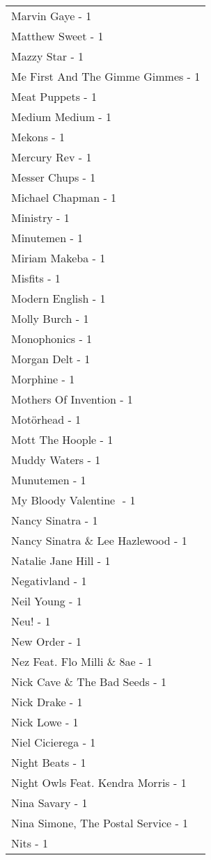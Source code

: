 \documentclass[
]{article}
\begin{document}
\begin{longtable}{l}
Marvin Gaye - 1 \\ 
Matthew Sweet - 1 \\ 
Mazzy Star - 1 \\ 
Me First And The Gimme Gimmes - 1 \\ 
Meat Puppets - 1 \\ 
Medium Medium - 1 \\ 
Mekons - 1 \\ 
Mercury Rev - 1 \\ 
Messer Chups - 1 \\ 
Michael Chapman - 1 \\ 
Ministry - 1 \\ 
Minutemen - 1 \\ 
Miriam Makeba - 1 \\ 
Misfits - 1 \\ 
Modern English - 1 \\ 
Molly Burch - 1 \\ 
Monophonics - 1 \\ 
Morgan Delt - 1 \\ 
Morphine - 1 \\ 
Mothers Of Invention - 1 \\ 
Motörhead - 1 \\ 
Mott The Hoople - 1 \\ 
Muddy Waters - 1 \\ 
Munutemen - 1 \\ 
My Bloody Valentine ‎ - 1 \\ 
Nancy Sinatra - 1 \\ 
Nancy Sinatra \& Lee Hazlewood - 1 \\ 
Natalie Jane Hill - 1 \\ 
Negativland - 1 \\ 
Neil Young - 1 \\ 
Neu! - 1 \\ 
New Order - 1 \\ 
Nez Feat. Flo Milli \& 8ae - 1 \\ 
Nick Cave \& The Bad Seeds - 1 \\ 
Nick Drake - 1 \\ 
Nick Lowe - 1 \\ 
Niel Cicierega - 1 \\ 
Night Beats - 1 \\ 
Night Owls Feat. Kendra Morris - 1 \\ 
Nina Savary - 1 \\ 
Nina Simone, The Postal Service - 1 \\ 
Nits - 1 \\ 

\end{longtable}
\end{document}
